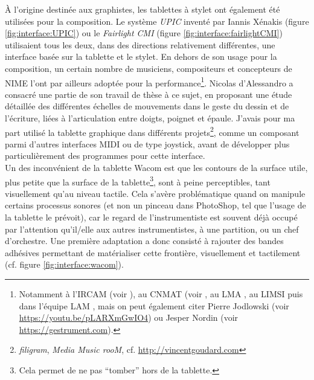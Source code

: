 \indent À l'origine destinée aux graphistes, les tablettes à stylet ont également été utilisées pour la composition. Le système \textit{UPIC} inventé par Iannis Xénakis (figure \ref{fig:interface:UPIC}) ou le \textit{Fairlight CMI}  (figure \ref{fig:interface:fairlightCMI}) utilisaient tous les deux, dans des directions relativement différentes, une interface basée sur la tablette et le stylet. En dehors de son usage pour la composition, un certain nombre de musiciens, compositeurs et concepteurs de \gls{NIME} l’ont par ailleurs adoptée pour la performance\footnote{Notamment à l'\gls{IRCAM} (voir \cite{wanderley_choice_2000}), au \gls{CNMAT} (voir \cite{zbyszynski_ten_2007}, au \gls{LMA} \cite{couturier_utilisation_2004}, au \gls{LIMSI} \cite{feugere_chorus_2011} puis dans l'équipe \gls{LAM} \cite{xiao_t-voks_2019}, mais on peut également citer Pierre Jodlowski (voir \url{https://youtu.be/pLARXmGwIO4}) ou Jesper Nordin (voir \url{https://gestrument.com}).}. Nicolas d’Alessandro a consacré une partie de son travail de thèse \cite{dalessandro_realtime_2009} à ce sujet, en proposant une étude détaillée des différentes échelles de mouvements dans le geste du dessin et de l'écriture, liées à l'articulation entre doigts, poignet et épaule. J'avais pour ma part utilisé la tablette graphique dans différents projets\footnote{\textit{filigram}, \textit{Media Music rooM}, cf. \url{http://vincentgoudard.com}}, comme un composant parmi d'autres interfaces \gls{MIDI} ou de type joystick, avant de développer plus particulièrement des programmes pour cette interface.\\
\indent Un des inconvénient de la tablette Wacom est que les contours de la surface utile, plus petite que la surface de la tablette\footnote{Cela permet de ne pas ``tomber'' hors de la tablette.}, sont à peine perceptibles, tant visuellement qu'au niveau tactile. Cela s'avère problématique quand on manipule certains processus sonores (et non un pinceau dans PhotoShop, tel que l'usage de la tablette le prévoit), car le regard de l'instrumentiste est souvent déjà occupé par l'attention qu'il/elle aux autres instrumentistes, à une partition, ou un chef d'orchestre. Une première adaptation a donc consisté à rajouter des bandes adhésives permettant de matérialiser cette frontière, visuellement et tactilement (cf. figure \ref{fig:interface:wacom}).\\
